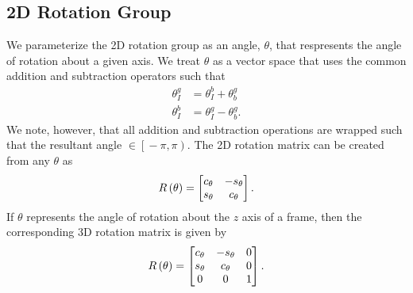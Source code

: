 
\subsection{2D Rotation Group}
We parameterize the 2D rotation group as an angle, $\theta$, that respresents
the angle of rotation about a given axis. We treat $\theta$ as a vector space
that uses the common addition and subtraction operators such that
\begin{align}
  \theta_I^g &= \theta_I^b + \theta_b^g \\
  \theta_I^b &= \theta_I^g - \theta_b^g.
\end{align}
We note, however, that all addition and subtraction operations are wrapped such
that the resultant angle $\in \left[ \right. -\pi, \pi \left. \right)$. The 2D
rotation matrix can be created from any $\theta$ as
\begin{equation}
  R \left( \theta \right) = \begin{bmatrix} c_\theta & -s_\theta \\ s_\theta &
  c_\theta \end{bmatrix}.
\end{equation}
If $\theta$ represents the angle of rotation about the $z$ axis of a frame, then
the corresponding 3D rotation matrix is given by
\begin{equation}
  R \left( \theta \right) = \begin{bmatrix}
    c_\theta & -s_\theta & 0 \\
    s_\theta & c_\theta & 0 \\
    0 & 0 & 1
  \end{bmatrix}.
\end{equation}
